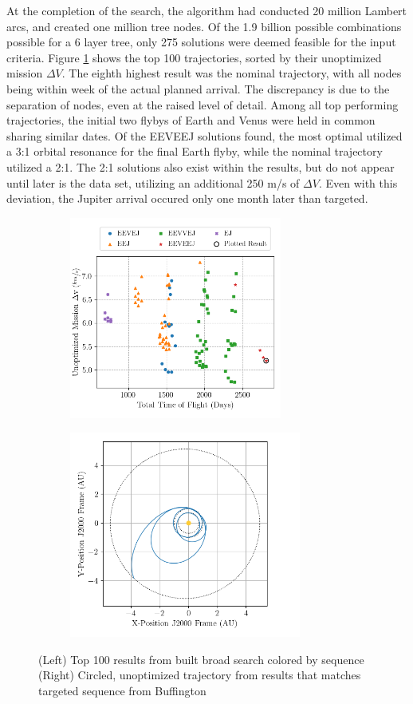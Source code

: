 \documentclass[letterpaper, preprint, paper,11pt]{AAS}	%
\begin{document}
At the completion of the search, the algorithm had conducted 20 million Lambert arcs, and created one million tree nodes. Of the 1.9 billion possible combinations possible for a 6 layer tree, only 275 solutions were deemed feasible for the input criteria. Figure \ref*{fig:clipResults} shows the top 100 trajectories, sorted by their unoptimized mission $\Delta V$. The eighth highest result was the nominal trajectory, with all nodes being within week of the actual planned arrival. The discrepancy is due to the separation of nodes, even at the raised level of detail. Among all top performing trajectories, the initial two flybys of Earth and Venus were held in common sharing similar dates. Of the EEVEEJ solutions found, the most optimal utilized a 3:1 orbital resonance for the final Earth flyby, while the nominal trajectory utilized a 2:1. The 2:1 solutions also exist within the results, but do not appear until later is the data set, utilizing an additional 250 m/s of $\Delta V$. Even with this deviation, the Jupiter arrival occured only one month later than targeted. 


\begin{figure}[htb]
    \begin{subfigure}
        \centering\includegraphics[width=2.75in]{./fig/clipperResults.png}
    \end{subfigure}
    \begin{subfigure}
        \centering\includegraphics[width=3in]{./fig/clipperMCTS.png}
    \end{subfigure}
    \caption{(Left) Top 100 results from built broad search colored by sequence\hspace{1em} (Right) Circled, unoptimized trajectory from results that matches targeted sequence from Buffington \cite{Buffington2014}}
    \label{fig:clipResults}
\end{figure}
\end{document}
